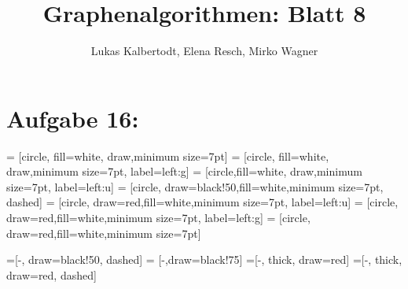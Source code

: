 \documentclass[11pt]{scrartcl} %
\title{Graphenalgorithmen: Blatt 8}
\author{Lukas Kalbertodt, Elena Resch, Mirko Wagner}
\begin{document}
\maketitle
\section*{Aufgabe 16:}
\newcommand{\stepsep}{\\ \multicolumn{2}{c}{\textcolor{lightgray}{\rule{8cm}{0.4pt}}} \\}

 = [circle, fill=white, draw,minimum size=7pt]
 = [circle, fill=white, draw,minimum size=7pt, label=left:g]
 = [circle,fill=white, draw,minimum size=7pt, label=left:u]
 = [circle, draw=black!50,fill=white,minimum size=7pt, dashed]
 = [circle, draw=red,fill=white,minimum size=7pt,
label=left:u]
 = [circle, draw=red,fill=white,minimum size=7pt,
label=left:g]
 = [circle, draw=red,fill=white,minimum size=7pt]

 =[-, draw=black!50, dashed]
 = [-,draw=black!75]
 =[-, thick, draw=red]
 =[-, thick, draw=red, dashed]

\newcommand{\makeTree}[2]{
  \foreach \pos/\name/\style in {#1}
    \node [\style] (\name) at \pos {$\name$};
  \foreach \start/\style/\end in {#2}
    \draw [\style] (\start) -- (\end);
}

\newcommand{\elem}[2]{
  \lbrace {#1},{#2} \rbrace
}
\end{document}
